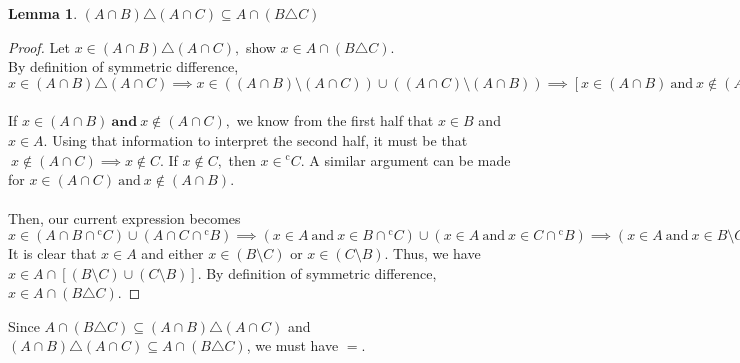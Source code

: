 \documentclass[12pt]{article}
\newtheorem{lemma}[theorem]{Lemma}
\theoremstyle{definition}
\numberwithin{equation}{subsection}
\begin{document}
\begin{lemma}
$(A \cap B) \triangle (A \cap C) \subseteq A \cap (B \triangle C)$
\end{lemma}
\begin{proof}
Let $x \in (A \cap B) \triangle (A \cap C),$ show $x \in A \cap (B \triangle C).$\\
By definition of symmetric difference, $x \in (A \cap B) \triangle (A \cap C) \implies x \in ((A \cap B) \setminus (A \cap C)) \cup ((A \cap C) \setminus (A \cap B)) \implies [x \in (A \cap B) \ \text{and} \ x \notin (A \cap C)] \ \text{or} \ [x \in (A \cap C) \ \text{and} \ x \notin (A \cap B)].$\\ \\
If $x \in (A \cap B) \ \textbf{and} \ x \notin (A \cap C),$ we know from the first half that $x \in B$ and $x \in A$. Using that information to interpret the second half, it must be that $\ x \notin (A \cap C) \implies x \notin C$. If $x \notin C,$ then $x \in {^{\mathrm{c}}}{C}.$ A similar argument can be made for $x \in (A \cap C) \ \text{and} \ x \notin (A \cap B).$\\\\
Then, our current expression becomes $x \in (A \cap B \cap {^{\mathrm{c}}}{C}) \cup (A \cap C \cap {^{\mathrm{c}}}{B}) \implies (x \in A \ \text{and} \ x \in B \cap {^{\mathrm{c}}}{C}) \cup (x \in A \ \text{and}\ x \in C \cap {^{\mathrm{c}}}{B}) \implies (x \in A \ \text{and} \ x \in B \setminus C) \ \textbf{or} \ (x \in A \ \text{and}\ x \in C \setminus B).$ It is clear that $x \in A$ and either $x \in (B \setminus C)$ or $x \in (C \setminus B).$ Thus, we have $x \in A \cap [(B \setminus C) \cup (C \setminus B)].$ By definition of symmetric difference, $x \in A \cap (B \triangle C).$
\end{proof}
Since $A \cap (B \triangle C) \subseteq (A \cap B) \triangle (A \cap C)$ and $(A \cap B) \triangle (A \cap C) \subseteq A \cap (B \triangle C)$, we must have $=.$ 
\end{document}
